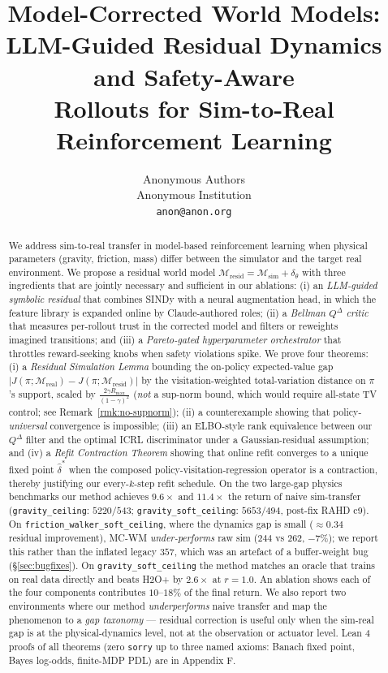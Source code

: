 \documentclass{article}
\title{Model-Corrected World Models:\\
LLM-Guided Residual Dynamics and Safety-Aware\\
Rollouts for Sim-to-Real Reinforcement Learning}
\author{%
  Anonymous Authors\\
  Anonymous Institution\\
  \texttt{anon@anon.org}
}
\theoremstyle{definition}
\newcommand{\Msim}{\mathcal{M}_{\mathrm{sim}}}
\newcommand{\Mreal}{\mathcal{M}_{\mathrm{real}}}
\newcommand{\Mresid}{\mathcal{M}_{\mathrm{resid}}}
\newcommand{\Rmax}{R_{\max}}
\newcommand{\QD}{Q^{\Delta}}
\begin{document}
\maketitle

\begin{abstract}
We address sim-to-real transfer in model-based reinforcement learning
when physical parameters (gravity, friction, mass) differ between the
simulator and the target real environment.  We propose a residual world
model $\Mresid = \Msim + \delta_\theta$ with three ingredients that are
jointly necessary and sufficient in our ablations:
(i) an \emph{LLM-guided symbolic residual} that combines SINDy with a
neural augmentation head, in which the feature library is expanded
online by Claude-authored roles;
(ii) a \emph{Bellman $\QD$ critic} that measures per-rollout trust in
the corrected model and filters or reweights imagined transitions; and
(iii) a \emph{Pareto-gated hyperparameter orchestrator} that throttles
reward-seeking knobs when safety violations spike.
We prove four theorems: (i) a \emph{Residual Simulation Lemma}
bounding the on-policy expected-value gap
$|J(\pi;\Mreal)-J(\pi;\Mresid)|$ by the visitation-weighted
total-variation distance on $\pi$'s support, scaled by
$\tfrac{2\gamma\Rmax}{(1-\gamma)^2}$ (\emph{not} a sup-norm bound,
which would require all-state TV control; see
Remark~\ref{rmk:no-supnorm}); (ii) a
counterexample showing that policy-\emph{universal} convergence is
impossible; (iii) an ELBO-style rank equivalence between our
$\QD$ filter and the optimal ICRL discriminator under a Gaussian-residual
assumption; and (iv) a \emph{Refit Contraction Theorem} showing that
online refit converges to a unique fixed point $\hat\delta^*$ when the
composed policy-visitation-regression operator is a contraction, thereby
justifying our every-$k$-step refit schedule.
On the two large-gap physics benchmarks our method achieves
$9.6\times$ and $11.4\times$ the return of naive sim-transfer
(\texttt{gravity\_ceiling}: $5220\!/\!543$;
 \texttt{gravity\_soft\_ceiling}: $5653\!/\!494$, post-fix RAHD c9).
On \texttt{friction\_walker\_soft\_ceiling}, where the dynamics gap is
small ($\approx\!0.34$ residual improvement), MC-WM \emph{under-performs}
raw sim ($244$ vs $262$, $-7\%$); we report this rather than the
inflated legacy $357$, which was an artefact of a buffer-weight bug
(\S\ref{sec:bugfixes}).  On \texttt{gravity\_soft\_ceiling} the method
matches an oracle that trains on real data directly and beats H2O+
by $2.6\times$ at $r=1.0$.  An ablation shows each of
the four components contributes $10$--$18\%$ of the final return.
We also report two environments where our method \emph{underperforms}
naive transfer and map the phenomenon to a \emph{gap taxonomy} ---
residual correction is useful only when the sim-real gap is at the
physical-dynamics level, not at the observation or actuator level.
Lean 4 proofs of all theorems (zero \texttt{sorry} up to three named
axioms: Banach fixed point, Bayes log-odds, finite-MDP PDL) are in
Appendix F.
\end{abstract}
\end{document}
